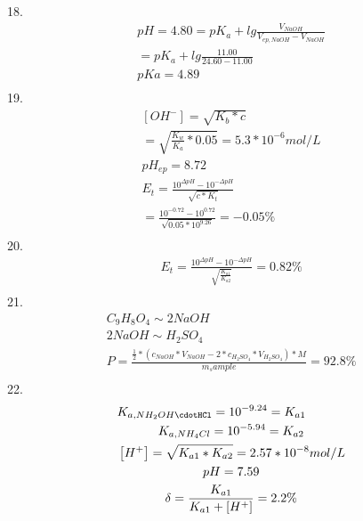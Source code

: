 \documentclass{article}
\begin{document}
18.\begin{equation}
    \begin{multlined}
    pH = 4.80 = pK_a + lg\frac{V_{NaOH}}{V_{ep, NaOH} - V_{NaOH}}\\
    =pK_a + lg\frac{11.00}{24.60 - 11.00}\\
    pKa = 4.89\\
    \end{multlined}
\end{equation}
19.\begin{equation}
    \begin{multlined}
        \left[OH^-\right] = \sqrt{K_b*c}\\
        =\sqrt{\frac{K_w}{K_a}*0.05} = 5.3*10^{-6} mol/L\\
        pH_{ep} = 8.72\\
        E_t = \frac{10^{\Delta pH}-10^{-\Delta pH}}{\sqrt{c*K_t}}\\
        =\frac{10^{-0.72} - 10^{0.72}}{\sqrt{0.05*10^{9.26}}} = -0.05\%\\
    \end{multlined}
\end{equation}
20.\begin{equation}
    \begin{multlined}
        E_t = \frac{10^{\Delta pH} - 10^{-\Delta pH}}{\sqrt{\frac{K_{a1}}{K_{a2}}}} = 0.82\%\\
    \end{multlined}
\end{equation}
21.\begin{equation}
    \begin{multlined}
        C_9H_8O_4 \sim 2NaOH\\
        2NaOH \sim H_2SO_4\\
        P = \frac{\frac{1}{2}*\left(c_{NaOH}*V_{NaOH} - 2*c_{H_2SO_4}*V_{H_2SO_4}\right)*M}{m_sample} = 92.8\%\\
    \end{multlined}
\end{equation}
22.\begin{equation}
    \begin{multlined}
        K_{a,NH_2OH\cdotHCl} = 10^{-9.24}=K_{a1}\\
        K_{a,NH_4Cl} = 10^{-5.94} = K_{a2}\\
        \left[H^+\right] = \sqrt{K_{a1}*K_{a2}} = 2.57*10^{-8} mol/L\\
        pH = 7.59\\
        \delta = \frac{K_{a1}}{K_{a1}+\left[H^+\right]} = 2.2\%\\
    \end{multlined}
\end{equation}
\end{document}
